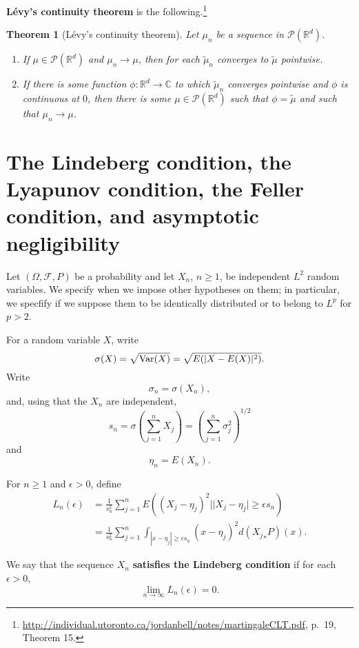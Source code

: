 \documentclass{article}
\newcommand{\Var}{\ensuremath\mathrm{Var}}
\newtheorem{theorem}{Theorem}
\theoremstyle{definition}
\begin{document}
\textbf{L\'evy's continuity theorem} is the following.\footnote{\url{http://individual.utoronto.ca/jordanbell/notes/martingaleCLT.pdf},
p.~19, Theorem 15.}

\begin{theorem}[L\'evy's continuity theorem]
Let $\mu_n$ be a sequence in $\mathscr{P}(\mathbb{R}^d)$.
\begin{enumerate}
\item If $\mu \in \mathscr{P}(\mathbb{R}^d)$ and $\mu_n \to \mu$, then for each $\tilde{\mu}_n$ converges to
$\tilde{\mu}$ pointwise.
\item If there is some function $\phi:\mathbb{R}^d \to \mathbb{C}$ to which $\tilde{\mu}_n$ converges pointwise
and $\phi$ is continuous at $0$, then there is some $\mu \in \mathscr{P}(\mathbb{R}^d)$ such that
$\phi=\tilde{\mu}$ and such that $\mu_n \to \mu$. 
\end{enumerate}
\label{levy}
\end{theorem}




\section{The Lindeberg condition, the Lyapunov condition, the Feller condition, and asymptotic negligibility}
Let $(\Omega,\mathscr{F},P)$ be a probability and let
$X_n$, $n \geq 1$, be independent $L^2$ random variables. We specify when we impose other hypotheses on them; in particular,
we specfify if we suppose them to be identically distributed or to belong to $L^p$ for $p>2$. 


For a random variable $X$, write
\[
\sigma(X) = \sqrt{\Var(X)} = \sqrt{E(|X-E(X)|^2)}.
\]
Write
\[
\sigma_n = \sigma(X_n),
\]
and, using that the $X_n$ are independent,
\[
s_n = \sigma\left( \sum_{j=1}^n X_j \right) = \left( \sum_{j=1}^n \sigma_j^2 \right)^{1/2}
\]
and
\[
\eta_n=E(X_n).
\]

For $n \geq 1$ and $\epsilon>0$, define
\begin{align*}
L_n(\epsilon)& = \frac{1}{s_n^2} \sum_{j=1}^n E((X_j-\eta_j)^2 | |X_j-\eta_j| \geq \epsilon s_n)\\
&=\frac{1}{s_n^2} \sum_{j=1}^n \int_{|x-\eta_j| \geq \epsilon s_n} (x-\eta_j)^2 d({X_j}_*P)(x).
\end{align*}

We say that the sequence  $X_n$ \textbf{satisfies the Lindeberg condition} if
for each $\epsilon>0$,
\[
\lim_{n \to \infty} L_n(\epsilon) = 0.
\]
\end{document}
